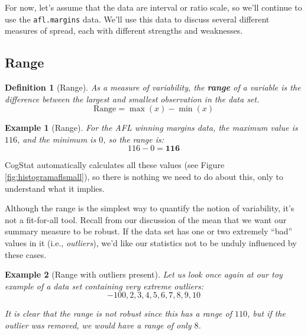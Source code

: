 \documentclass[
  11pt,
]{book}
\theoremstyle{indenteddefinition}
\newtheorem{definition}{Definition}[chapter]
\theoremstyle{indenteddefinition}
\newtheorem{example}{Example}[chapter]
\theoremstyle{definition}
\theoremstyle{definition}
\theoremstyle{remark}
\begin{document}
For now, let's assume that the data are interval or ratio scale, so we'll continue to use the \texttt{afl.margins} data. We'll use this data to discuss several different measures of spread, each with different strengths and weaknesses.

\hypertarget{range}{%
\subsection{Range}\label{range}}

\begin{definition}[Range]
\protect\hypertarget{def:defrange}{}\label{def:defrange}As a measure of variability, the \textbf{range} of a variable is the difference between the largest and smallest observation in the data set.
\[
\text{Range}=\max(x)-\min(x)
\]
\end{definition}

\begin{example}[Range]
\protect\hypertarget{exm:exrange}{}\label{exm:exrange}For the AFL winning margins data, the maximum value is \(116\), and the minimum is \(0\), so the range is:
\[116-0=\mathbf{116}\]
\end{example}

CogStat automatically calculates all these values (see Figure \ref{fig:histogramaflsmall}), so there is nothing we need to do about this, only to understand what it implies.

Although the range is the simplest way to quantify the notion of variability, it's not a fit-for-all tool. Recall from our discussion of the mean that we want our summary measure to be robust. If the data set has one or two extremely ``bad'' values in it (i.e., \emph{outliers}), we'd like our statistics not to be unduly influenced by these cases.

\begin{example}[Range with outliers present]
\protect\hypertarget{exm:exrange2}{}\label{exm:exrange2}Let us look once again at our toy example of a data set containing very extreme outliers:
\[
-100,2,3,4,5,6,7,8,9,10
\]

It is clear that the range is not robust since this has a range of \(110\), but if the outlier was removed, we would have a range of only \(8\).
\end{example}
\end{document}
